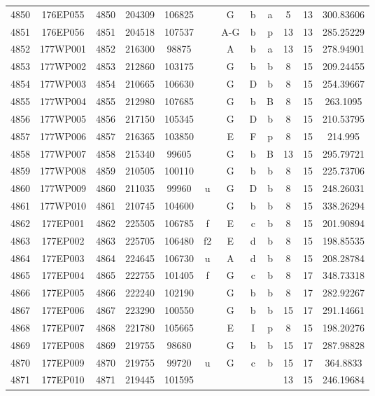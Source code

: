 \begin{tabular}{|*{12}{c|}}
4850 & 176EP055 & 4850 & 204309 & 106825 &  & G & b & a & 5 & 13 & 300.83606 \\ 
4851 & 176EP056 & 4851 & 204518 & 107537 &  & A-G & b & p & 13 & 13 & 285.25229 \\ 
4852 & 177WP001 & 4852 & 216300 & 98875 &  & A & b & a & 13 & 15 & 278.94901 \\ 
4853 & 177WP002 & 4853 & 212860 & 103175 &  & G & b & b & 8 & 15 & 209.24455 \\ 
4854 & 177WP003 & 4854 & 210665 & 106630 &  & G & D & b & 8 & 15 & 254.39667 \\ 
4855 & 177WP004 & 4855 & 212980 & 107685 &  & G & b & B & 8 & 15 & 263.1095 \\ 
4856 & 177WP005 & 4856 & 217150 & 105345 &  & G & D & b & 8 & 15 & 210.53795 \\ 
4857 & 177WP006 & 4857 & 216365 & 103850 &  & E & F & p & 8 & 15 & 214.995 \\ 
4858 & 177WP007 & 4858 & 215340 & 99605 &  & G & b & B & 13 & 15 & 295.79721 \\ 
4859 & 177WP008 & 4859 & 210505 & 100110 &  & G & b & b & 8 & 15 & 225.73706 \\ 
4860 & 177WP009 & 4860 & 211035 & 99960 & u & G & D & b & 8 & 15 & 248.26031 \\ 
4861 & 177WP010 & 4861 & 210745 & 104600 &  & G & b & b & 8 & 15 & 338.26294 \\ 
4862 & 177EP001 & 4862 & 225505 & 106785 & f & E & c & b & 8 & 15 & 201.90894 \\ 
4863 & 177EP002 & 4863 & 225705 & 106480 & f2 & E & d & b & 8 & 15 & 198.85535 \\ 
4864 & 177EP003 & 4864 & 224645 & 106730 & u & A & d & b & 8 & 15 & 208.28784 \\ 
4865 & 177EP004 & 4865 & 222755 & 101405 & f & G & c & b & 8 & 17 & 348.73318 \\ 
4866 & 177EP005 & 4866 & 222240 & 102190 &  & G & b & b & 8 & 17 & 282.92267 \\ 
4867 & 177EP006 & 4867 & 223290 & 100550 &  & G & b & b & 15 & 17 & 291.14661 \\ 
4868 & 177EP007 & 4868 & 221780 & 105665 &  & E & I & p & 8 & 15 & 198.20276 \\ 
4869 & 177EP008 & 4869 & 219755 & 98680 &  & G & b & b & 15 & 17 & 287.98828 \\ 
4870 & 177EP009 & 4870 & 219755 & 99720 & u & G & c & b & 15 & 17 & 364.8833 \\ 
4871 & 177EP010 & 4871 & 219445 & 101595 &  &  &  &  & 13 & 15 & 246.19684 \\ 

\end{tabular}
